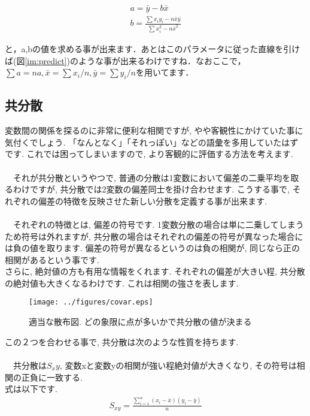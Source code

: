 \documentclass[11pt,a4paper]{ujreport}
\begin{document}
\begin{eqnarray}
a = \bar y - b\bar x\\
b = \frac{\sum x_i y_i - n \bar{x} \bar{y}}{\sum x_i^2 - n\bar{x}^2}
\end{eqnarray}

と，a,bの値を求める事が出来ます．あとはこのパラメータに従った直線を引けば(図\ref{im:predict})のような事が出来るわけですね．なおここで，$\sum a = na, \bar x = \sum x_i/n, \bar y = \sum y_i/n$を用いてます．

\subsection{共分散}
変数間の関係を探るのに非常に便利な相関ですが, やや客観性にかけていた事に気付くでしょう. 「なんとなく」「それっぽい」などの語彙を多用していたはずです. これでは困ってしまいますので, より客観的に評価する方法を考えます.\\
\\
　それが共分散というやつで, 普通の分散は1変数において偏差の二乗平均を取るわけですが, 共分散では2変数の偏差同士を掛け合わせます. こうする事で, それぞれの偏差の特徴を反映させた新しい分散を定義する事が出来ます. \\
\\
　それぞれの特徴とは, 偏差の符号です. 1変数分散の場合は単に二乗してしまうため符号は外れますが, 共分散の場合はそれぞれの偏差の符号が異なった場合には負の値を取ります. 偏差の符号が異なるというのは負の相関が, 同じなら正の相関があるという事です.\\
さらに, 絶対値の方も有用な情報をくれます. それぞれの偏差が大きい程, 共分散の絶対値も大きくなるわけです. これは相関の強さを表します.\\

\begin{figure}[H]
\label{im:co-var}
  \centering
  \texttt{[image: ../figures/covar.eps]}
  \caption{適当な散布図. どの象限に点が多いかで共分散の値が決まる}
\end{figure}

この２つを合わせる事で, 共分散は次のような性質を持ちます.\\
\\
　共分散は$S_xy$, 変数xと変数yの相関が強い程絶対値が大きくなり, その符号は相関の正負に一致する.
\\
式は以下です.\\
\begin{eqnarray}
\label{eq:covar}
S_{xy} = \frac{\sum_{i=1}^{n} (x_i - \bar{x})(y_i - \bar{y})}{n}
\end{eqnarray}
\end{document}
